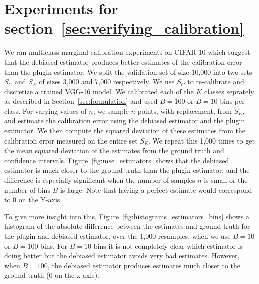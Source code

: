 \newpage

\section{Experiments for section~\ref{sec:verifying_calibration}}
\label{sec:verifying_calibration_appendix_experiments}

\newcommand{\calset}[0]{\ensuremath{S_C}}
\newcommand{\verifset}[0]{\ensuremath{S_E}}

We ran multiclass marginal calibration experiments on CIFAR-10 which suggest that the debiased estimator produces better estimates of the calibration error than the plugin estimator. We split the validation set of size 10,000 into two sets $\calset{}$ and $\verifset{}$ of sizes 3,000 and 7,000 respectively. We use $\calset{}$ to re-calibrate and discretize a trained VGG-16 model. We calibrated each of the $K$ classes seprately as described in Section~\ref{sec:formulation} and used $B = 100$ or $B = 10$ bins per class. For varying values of $n$, we sample $n$ points, with replacement, from $\verifset{}$, and estimate the calibration error using the debiased estimator and the plugin estimator. We then compute the squared deviation of these estimates from the calibration error measured on the entire set $\verifset{}$. We repeat this 1,000 times to get the mean squared deviation of the estimates from the ground truth and confidence intervals. Figure~\ref{fig:mse_estimators} shows that the debiased estimator is much closer to the ground truth than the plugin estimator, and the difference is especially significant when the number of samples $n$ is small or the number of bins $B$ is large. Note that having a perfect estimate would correspond to $0$ on the Y-axis.

To give more insight into this, Figure~\ref{fig:histograms_estimators_bins} shows a histogram of the absolute difference between the estimates and ground truth for the plugin and debiased estimator, over the 1,000 resamples, when we use $B = 10$ or $B = 100$ bins. For $B = 10$ bins it is not completely clear which estimator is doing better but the debiased estimator avoids very bad estimates. However, when $B = 100$, the debiased estimator produces estimates much closer to the ground truth ($0$ on the x-axis).

